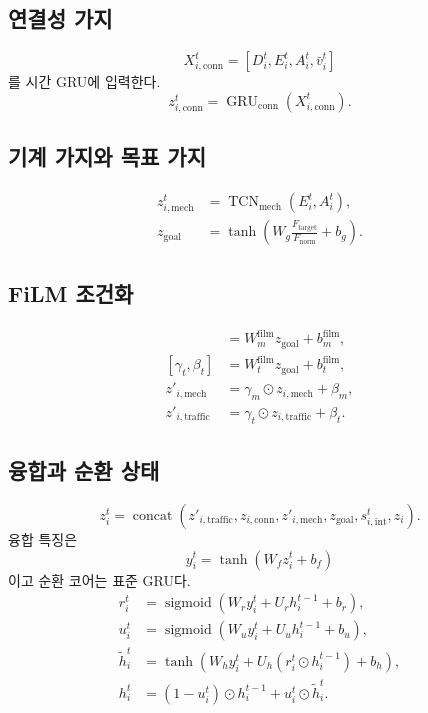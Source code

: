 \documentclass[11pt,a4paper]{article}
\newcommand{\Ftarget}{F_{\mathrm{target}}}
\newcommand{\concat}{\operatorname{concat}}
\newcommand{\sigmoid}{\operatorname{sigmoid}}
\begin{document}
\subsection{연결성 가지}

\begin{equation}
  X_{i,\mathrm{conn}}^t
  =
  [D_i^t,E_i^t,A_i^t,\bar v_i^t]
\end{equation}
를 시간 GRU에 입력한다.
\begin{equation}
  z_{i,\mathrm{conn}}^t
  =
  \operatorname{GRU}_{\mathrm{conn}}
  (X_{i,\mathrm{conn}}^t).
  \label{eq:connectivity-encoder}
\end{equation}

\subsection{기계 가지와 목표 가지}

\begin{align}
  z_{i,\mathrm{mech}}^t
    &=
    \operatorname{TCN}_{\mathrm{mech}}(E_i^t,A_i^t),\\
  z_{\mathrm{goal}}
    &=
    \tanh\left(
      W_g\frac{\Ftarget}{F_{\mathrm{norm}}}+b_g
    \right).
\end{align}

\subsection{FiLM 조건화}

\begin{align}
  [\gamma_m,\beta_m]
    &=W_m^{\mathrm{film}}z_{\mathrm{goal}}+b_m^{\mathrm{film}},\\
  [\gamma_t,\beta_t]
    &=W_t^{\mathrm{film}}z_{\mathrm{goal}}+b_t^{\mathrm{film}},\\
  z'_{i,\mathrm{mech}}
    &=\gamma_m\odot z_{i,\mathrm{mech}}+\beta_m,\\
  z'_{i,\mathrm{traffic}}
    &=\gamma_t\odot z_{i,\mathrm{traffic}}+\beta_t.
  \label{eq:film}
\end{align}

\subsection{융합과 순환 상태}

\begin{equation}
  z_i^t=
  \concat\left(
    z'_{i,\mathrm{traffic}},
    z_{i,\mathrm{conn}},
    z'_{i,\mathrm{mech}},
    z_{\mathrm{goal}},
    s_{i,\mathrm{int}}^t,
    z_i
  \right).
\end{equation}
융합 특징은
\begin{equation}
  y_i^t=\tanh(W_fz_i^t+b_f)
\end{equation}
이고 순환 코어는 표준 GRU다.
\begin{align}
  r_i^t &=
  \sigmoid(W_ry_i^t+U_rh_i^{t-1}+b_r),\\
  u_i^t &=
  \sigmoid(W_uy_i^t+U_uh_i^{t-1}+b_u),\\
  \widetilde h_i^t &=
  \tanh(W_hy_i^t+U_h(r_i^t\odot h_i^{t-1})+b_h),\\
  h_i^t &=
  (1-u_i^t)\odot h_i^{t-1}
  +u_i^t\odot\widetilde h_i^t.
  \label{eq:actor-gru}
\end{align}
\end{document}
